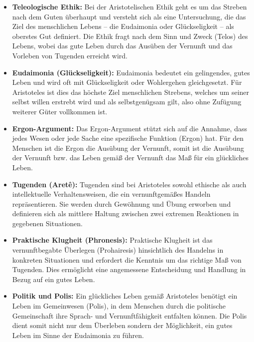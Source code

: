 \documentclass{article}
\begin{document}
\begin{itemize}
	\item \textbf{Teleologische Ethik:}
	      Bei der Aristotelischen Ethik geht es um das Streben nach dem Guten überhaupt und versteht sich als eine Untersuchung, die das Ziel des menschlichen Lebens – die Eudaimonia oder Glückseligkeit – als oberstes Gut definiert. Die Ethik fragt nach dem Sinn und Zweck (Telos) des Lebens, wobei das gute Leben durch das Ausüben der Vernunft und das Vorleben von Tugenden erreicht wird.

	\item \textbf{Eudaimonia (Glückseligkeit):}
	      Eudaimonia bedeutet ein gelingendes, gutes Leben und wird oft mit Glückseligkeit oder Wohlergehen gleichgesetzt. Für Aristoteles ist dies das höchste Ziel menschlichen Strebens, welches um seiner selbst willen erstrebt wird und als selbstgenügsam gilt, also ohne Zufügung weiterer Güter vollkommen ist.

	\item \textbf{Ergon-Argument:}
	      Das Ergon-Argument stützt sich auf die Annahme, dass jedes Wesen oder jede Sache eine spezifische Funktion (Ergon) hat. Für den Menschen ist die Ergon die Ausübung der Vernunft, somit ist die Ausübung der Vernunft bzw. das Leben gemäß der Vernunft das Maß für ein glückliches Leben.

	\item \textbf{Tugenden (Aretê):}
	      Tugenden sind bei Aristoteles sowohl ethische als auch intellektuelle Verhaltensweisen, die ein vernunftgemäßes Handeln repräsentieren. Sie werden durch Gewöhnung und Übung erworben und definieren sich als mittlere Haltung zwischen zwei extremen Reaktionen in gegebenen Situationen.

	\item \textbf{Praktische Klugheit (Phronesis):}
	      Praktische Klugheit ist das vernunftbegabte Überlegen (Prohairesis) hinsichtlich des Handelns in konkreten Situationen und erfordert die Kenntnis um das richtige Maß von Tugenden. Dies ermöglicht eine angemessene Entscheidung und Handlung in Bezug auf ein gutes Leben.

	\item \textbf{Politik und Polis:}
	      Ein glückliches Leben gemäß Aristoteles benötigt ein Leben im Gemeinwesen (Polis), in dem Menschen durch die politische Gemeinschaft ihre Sprach- und Vernunftfähigkeit entfalten können. Die Polis dient somit nicht nur dem Überleben sondern der Möglichkeit, ein gutes Leben im Sinne der Eudaimonia zu führen.
\end{itemize}
\end{document}
